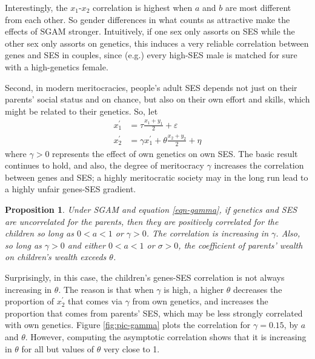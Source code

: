 \documentclass[
]{article}
\newtheorem{proposition}{Proposition}
\theoremstyle{definition}
\theoremstyle{definition}
\theoremstyle{definition}
\theoremstyle{definition}
\theoremstyle{remark}
\begin{document}
Interestingly, the \(x_1\)-\(x_2\) correlation is highest when \(a\) and \(b\) are most
different from each other. So gender differences in what counts as attractive
make the effects of SGAM stronger. Intuitively, if one sex only assorts on
SES while the other sex only assorts on genetics, this induces a very reliable
correlation between genes and SES in couples, since (e.g.) every high-SES male
is matched for sure with a high-genetics female.

Second, in modern meritocracies, people's adult SES depends not just
on their parents' social status and on chance, but also on their own effort and
skills, which might be related to their genetics. So, let
\begin{align}
x^\prime_1 &= \tau \frac{x_{1} + y_{1}}{2} + \varepsilon   \nonumber \\
x^\prime_2 &= \gamma x^\prime_1 + \theta \frac{x_{2}+y_{2}}{2}+\eta \label{eqn-gamma}
\end{align}
where \(\gamma > 0\) represents the effect of own genetics on own SES.
The basic result continues to hold, and also, the degree of meritocracy \(\gamma\)
increases the correlation between genes and SES; a highly meritocratic
society may in the long run lead to a highly unfair genes-SES gradient.

\begin{proposition}\label{prop-gamma}
Under SGAM and equation \eqref{eqn-gamma}, if genetics and SES are 
uncorrelated for the parents, then they
are positively correlated for the children so long as $0 < a < 1$ or
$\gamma > 0$. The correlation is increasing in $\gamma$. Also, so 
long as $\gamma > 0$ and either $0 < a < 1$ or $\sigma > 0$, the coefficient 
of parents' wealth on children's wealth exceeds $\theta$.
\end{proposition}

Surprisingly, in this case, the children's genes-SES correlation is not always
increasing in \(\theta\). The reason is that when \(\gamma\) is high, a higher
\(\theta\) decreases the proportion of \(x^\prime_2\) that comes via \(\gamma\) from
own genetics, and increases the proportion that comes from parents' SES, which
may be less strongly correlated with own genetics. Figure \ref{fig:pic-gamma}
plots the correlation for \(\gamma = 0.15\), by \(a\) and \(\theta\). However,
computing the asymptotic correlation shows that it is increasing in \(\theta\) for
all but values of \(\theta\) very close to 1.
\end{document}
